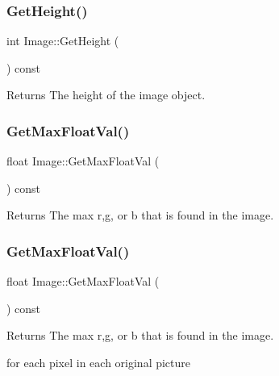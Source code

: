 \subsubsection{\texorpdfstring{Get\+Height()}{GetHeight()}\hspace{0.1cm}{\footnotesize\ttfamily [2/2]}}
{\footnotesize\ttfamily int Image\+::\+Get\+Height (\begin{DoxyParamCaption}{ }\end{DoxyParamCaption}) const}

\begin{DoxyReturn}{Returns}
The height of the image object. 
\end{DoxyReturn}
\mbox{\label{classImage_a9efc74ed4a9af25d1eb01416ec47e78e}} 
\subsubsection{\texorpdfstring{Get\+Max\+Float\+Val()}{GetMaxFloatVal()}\hspace{0.1cm}{\footnotesize\ttfamily [1/2]}}
{\footnotesize\ttfamily float Image\+::\+Get\+Max\+Float\+Val (\begin{DoxyParamCaption}{ }\end{DoxyParamCaption}) const}

\begin{DoxyReturn}{Returns}
The max r,g, or b that is found in the image. 
\end{DoxyReturn}
\mbox{\label{classImage_a9efc74ed4a9af25d1eb01416ec47e78e}} 
\subsubsection{\texorpdfstring{Get\+Max\+Float\+Val()}{GetMaxFloatVal()}\hspace{0.1cm}{\footnotesize\ttfamily [2/2]}}
{\footnotesize\ttfamily float Image\+::\+Get\+Max\+Float\+Val (\begin{DoxyParamCaption}{ }\end{DoxyParamCaption}) const}

\begin{DoxyReturn}{Returns}
The max r,g, or b that is found in the image. 
\end{DoxyReturn}
for each pixel in each original picture \mbox{\label{classImage_a01fc9742fb7bb83f66027d5c9091d477}} 
